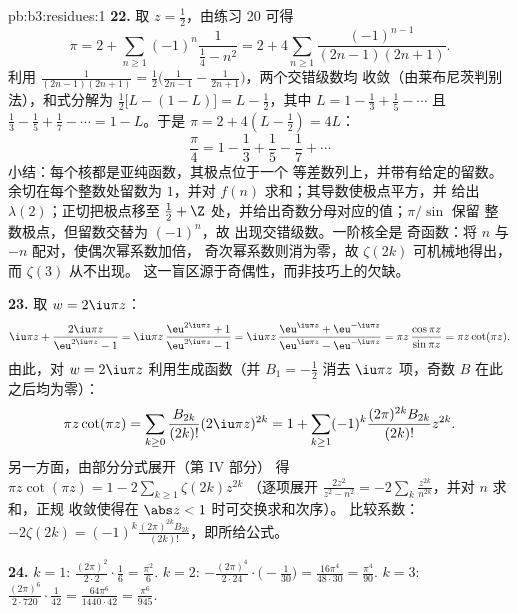 \begin{solution}{pb:b3:residues:1}
\textbf{22.} 取 $z = \frac12$，由练习 20 可得
\[
\pi = 2 + \sum_{n\geq1}(-1)^n\frac{1}{\frac14 - n^2}
= 2 + 4\sum_{n\geq1}\frac{(-1)^{n-1}}{(2n-1)(2n+1)} .
\]
利用 $\frac1{(2n-1)(2n+1)} = \frac12\bigl(\frac1{2n-1} -
\frac1{2n+1}\bigr)$，两个交错级数均
收敛（由莱布尼茨判别法），和式分解为 $\frac12\bigl[L -
(1 - L)\bigr] = L - \frac12$，其中 $L = 1 - \frac13 +
\frac15 - \cdots$ 且 $\frac13 - \frac15 + \frac17 - \cdots
= 1 - L$。于是 $\pi = 2 + 4(L - \frac12) = 4L$：
\[
\frac\pi4 = 1 - \frac13 + \frac15 - \frac17 + \cdots
\]
小结：每个核都是亚纯函数，其极点位于一个
等差数列上，并带有给定的留数。
余切在每个整数处留数为 $1$，并对
$f(n)$ 求和；其导数使极点平方，并
给出 $\lambda(2)$；正切把极点移至
$\frac12 + \Z$ 处，并给出奇数分母对应的值；$\pi/\sin$ 保留
整数极点，但留数交替为 $(-1)^n$，故
出现交错级数。一阶核全是
奇函数：将 $n$ 与 $-n$ 配对，使偶次幂系数加倍，
奇次幂系数则消为零，故 $\zeta(2k)$
可机械地得出，而 $\zeta(3)$ 从不出现。
这一盲区源于奇偶性，而非技巧上的欠缺。

\textbf{23.} 取 $w = 2\iu\pi z$：
\[
\iu\pi z + \frac{2\iu\pi z}{\eu^{2\iu\pi z} - 1}
= \iu\pi z\,\frac{\eu^{2\iu\pi z} + 1}{\eu^{2\iu\pi z} - 1}
= \iu\pi z\,\frac{\eu^{\iu\pi z} +
\eu^{-\iu\pi z}}{\eu^{\iu\pi z} - \eu^{-\iu\pi z}}
= \pi z\,\frac{\cos\pi z}{\sin\pi z} = \pi z\cot(\pi z) .
\]
由此，对 $w = 2\iu\pi z$ 利用生成函数（并
$B_1 = -\frac12$ 消去 $\iu\pi z$ 项，奇数 $B$
在此之后均为零）：
\[
\pi z\cot(\pi z) = \sum_{k\geq0}\frac{B_{2k}}{(2k)!}
(2\iu\pi z)^{2k}
= 1 + \sum_{k\geq1}(-1)^k\frac{(2\pi)^{2k}B_{2k}}{(2k)!}
z^{2k} .
\]
另一方面，由部分分式展开（第 IV 部分）
得 $\pi z\cot(\pi z) = 1 - 2\sum_{k\geq1}\zeta(2k)z^{2k}$
（逐项展开 $\frac{2z^2}{z^2 - n^2} =
-2\sum_k\frac{z^{2k}}{n^{2k}}$，并对 $n$ 求和，正规
收敛使得在 $\abs z < 1$ 时可交换求和次序）。
比较系数：$-2\zeta(2k) =
(-1)^k\frac{(2\pi)^{2k}B_{2k}}{(2k)!}$，即所给公式。

\textbf{24.} $k = 1$: $\frac{(2\pi)^2}{2\cdot2}\cdot\frac16
= \frac{\pi^2}6$. $k = 2$: $-\frac{(2\pi)^4}{2\cdot24}
\cdot\bigl(-\frac1{30}\bigr) = \frac{16\pi^4}{48\cdot30} =
\frac{\pi^4}{90}$. $k = 3$: $\frac{(2\pi)^6}{2\cdot720}
\cdot\frac1{42} = \frac{64\pi^6}{1440\cdot42} =
\frac{\pi^6}{945}$.


\end{solution}
